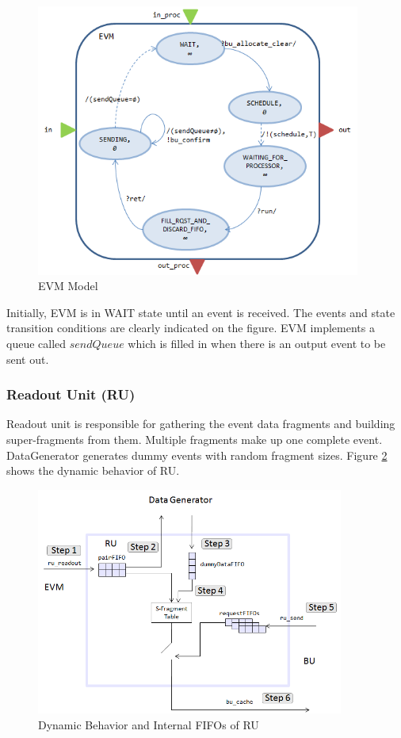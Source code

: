 \begin{figure}
	\centering
		\includegraphics[width=0.95\textwidth]{figures/evmmodel1.png}
	\caption{EVM Model}
	\label{fig:evmmodel1}
\end{figure}

Initially, EVM is in WAIT state until an event is received. The events and state transition conditions are clearly indicated on the figure. EVM implements a queue called $sendQueue$ which is filled in when there is an output event to be sent out. 

\subsubsection{Readout Unit (RU)}
Readout unit is responsible for gathering the event data fragments and building super-fragments from them. Multiple fragments make up one complete event. DataGenerator generates dummy events with random fragment sizes. Figure \ref{fig:ru_behavior} shows the dynamic behavior of RU.

\begin{figure}
 \centering
 \includegraphics[width=0.90\textwidth]{figures/ru_behavior.png}
 \caption{Dynamic Behavior and Internal FIFOs of RU}
 \label{fig:ru_behavior}
\end{figure}


